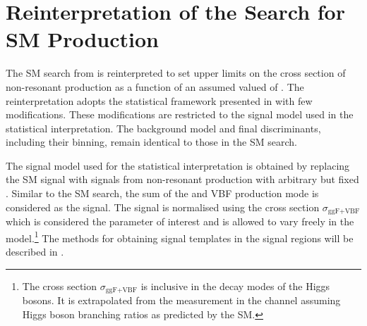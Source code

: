 \section{Reinterpretation of the Search for SM \HH Production}%
\label{sec:reinterpretation}

The SM \HH search from  is reinterpreted to set
upper limits on the cross section of non-resonant \HH production as a
function of an assumed valued of \klambda. %
The reinterpretation adopts the statistical framework presented in
 with few modifications. These
modifications are restricted to the signal model used in the
statistical interpretation. The background model and final
discriminants, including their binning, remain identical to those in
the SM \HH search.

The signal model used for the statistical interpretation is obtained
by replacing the SM \HH signal with signals from non-resonant \HH
production with arbitrary but fixed \klambda. Similar to the SM \HH
search, the sum of the \ggF and VBF production mode is considered as
the signal. The signal is normalised using the cross section
$\sigma_{\text{ggF+VBF}}$ which is considered the parameter of
interest and is allowed to vary freely in the model.\footnote{The
  cross section $\sigma_{\text{ggF+VBF}}$ is inclusive in the decay
  modes of the Higgs bosons. It is extrapolated from the measurement
  in the \bbtautau channel assuming Higgs boson branching ratios as
  predicted by the SM.}  The methods for obtaining signal templates in
the signal regions will be described in
.

